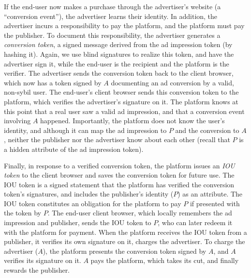 %
If the end-user now makes a purchase through the advertiser's website (a ``conversion event''), the advertiser learns their identity.
%
In addition, the advertiser incurs a responsibility to pay the platform, and the platform must pay the publisher.
%
To document this responsibility, the advertiser generates a \emph{conversion token}, a signed message derived from the ad impression token (\eg by hashing it).
%
Again, we use blind signatures to realize this token, and have the advertiser sign it, while the end-user is the recipient and the platform is the verifier.
%
The advertiser sends the conversion token back to the client browser, which now has a token signed by $A$ documenting an ad conversion by a valid, non-sybil user.
%
The end-user's client browser sends this conversion token to the platform, which verifies the advertiser's signature on it.
%
The platform knows at this point that a real user saw a valid ad impression, and that a conversion event involving $A$ happened.
%
Importantly, the platform does not know the user's identity, and although it can map the ad impression to $P$ and the conversion to $A$, neither the publisher nor the advertiser know about each other (recall that $P$ is a hidden attribute of the ad impression token).
%

%
Finally, in response to a verified conversion token, the platform issues an \emph{IOU token} to the client browser and saves the conversion token for future use.
%
The IOU token is a signed statement that the platform has verified the conversion token's signatures, and includes the publisher's identity ($P$) as an attribute.
%
The IOU token constitutes an obligation for the platform to pay $P$ if presented with the token by $P$.
%
The end-user client browser, which locally remembers the ad impression and publisher, sends the IOU token to $P$, who can later redeem it with the platform for payment.
%
When the platform receives the IOU token from a publisher, it verifies its own signature on it, charges the advertiser.
%
To charge the advertiser ($A$), the platform presents the conversion token signed by $A$, and $A$ verifies its signature on it.
%
$A$ pays the platform, which takes its cut, and finally rewards the publisher.
%

